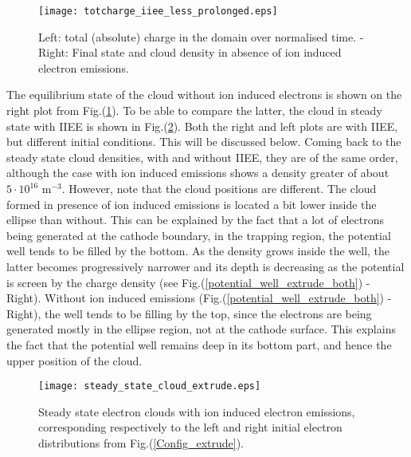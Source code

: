 \begin{figure}[h!]
\centering
	\texttt{[image: totcharge\_iiee\_less\_prolonged.eps]}
	\caption{\label{totcharge_iiee_less} Left: total (absolute) charge in the domain over normalised time. - Right: Final state and cloud density in absence of ion induced electron emissions.}
\end{figure}

\noindent The equilibrium state of the cloud without ion induced electrons is shown on the right plot from Fig.(\ref{totcharge_iiee_less}). To be able to compare the latter, the cloud in steady state with IIEE is shown in Fig.(\ref{steady_state_cloud_extrude}). Both the right and left plots are with IIEE, but different initial conditions. This will be discussed below. Coming back to the steady state cloud densities, with and without IIEE, they are of the same order, although the case with ion induced emissions shows a density greater of about $5\cdot 10^{16}$ m$^{-3}$. However, note that the cloud positions are different. The cloud formed in presence of ion induced emissions is located a bit lower inside the ellipse than without. This can be explained by the fact that a lot of electrons being generated at the cathode boundary, in the trapping region, the potential well tends to be filled by the bottom. As the density grows inside the well, the latter becomes progressively narrower and its depth is decreasing as the potential is screen by the charge density (see Fig.(\ref{potential_well_extrude_both}) - Right). Without ion induced emissions (Fig.(\ref{potential_well_extrude_both}) - Right), the well tends to be filling by the top, since the electrons are being generated mostly in the ellipse region, not at the cathode surface. This explains the fact that the potential well remains deep in its bottom part, and hence the upper position of the cloud.\\

\begin{figure}[h!]
\centering
	\texttt{[image: steady\_state\_cloud\_extrude.eps]}
	\caption{\label{steady_state_cloud_extrude} Steady state electron clouds with ion induced electron emissions, corresponding respectively to the left and right initial electron distributions from Fig.(\ref{Config_extrude}).}
\end{figure}

